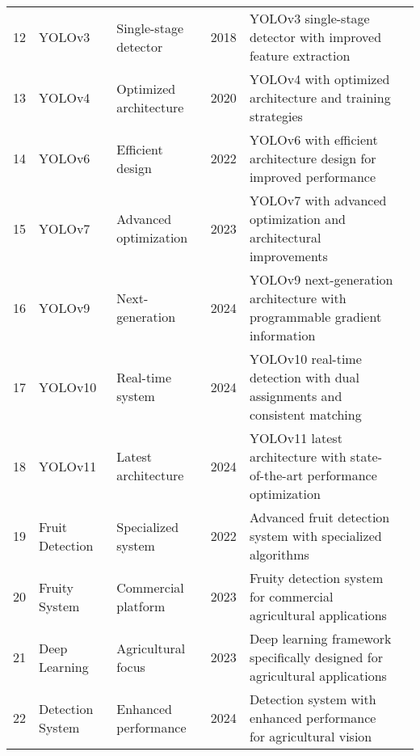 \begin{table*}[htbp]
\begin{tabular}{p{}p{}p{}p{}p{}p{}}
 12 & YOLOv3 & Single-stage detector & 2018 & YOLOv3 single-stage detector with improved feature extraction & \cite{qiao2021detectors} \\
 13 & YOLOv4 & Optimized architecture & 2020 & YOLOv4 with optimized architecture and training strategies & \cite{redmon2018yolov3} \\
 14 & YOLOv6 & Efficient design & 2022 & YOLOv6 with efficient architecture design for improved performance & \cite{bochkovskiy2020yolov4} \\
 15 & YOLOv7 & Advanced optimization & 2023 & YOLOv7 with advanced optimization and architectural improvements & \cite{li2022yolov6} \\
 16 & YOLOv9 & Next-generation & 2024 & YOLOv9 next-generation architecture with programmable gradient information & \cite{wang2023yolov7} \\
 17 & YOLOv10 & Real-time system & 2024 & YOLOv10 real-time detection with dual assignments and consistent matching & \cite{yaseen2024yolov9} \\
 18 & YOLOv11 & Latest architecture & 2024 & YOLOv11 latest architecture with state-of-the-art performance optimization & \cite{wang2024yolov10} \\
 19 & Fruit Detection & Specialized system & 2022 & Advanced fruit detection system with specialized algorithms & \cite{khanam2410yolov11} \\
 20 & Fruity System & Commercial platform & 2023 & Fruity detection system for commercial agricultural applications & \cite{gai2022fruit} \\
 21 & Deep Learning & Agricultural focus & 2023 & Deep learning framework specifically designed for agricultural applications & \cite{abdulsalam2023fruity} \\
 22 & Detection System & Enhanced performance & 2024 & Detection system with enhanced performance for agricultural vision & \cite{zhang2023deep} \\
\bottomrule
\end{tabular}
\end{table*}